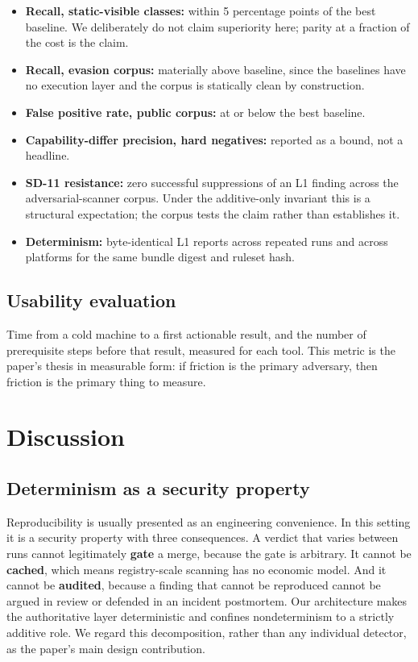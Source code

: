 \documentclass[11pt]{article}
\begin{document}
\begin{itemize}[leftmargin=*,itemsep=2pt]
\item \textbf{Recall, static-visible classes:} within 5 percentage points of the best baseline. We deliberately do not claim superiority here; parity at a fraction of the cost is the claim.
\item \textbf{Recall, evasion corpus:} materially above baseline, since the baselines have no execution layer and the corpus is statically clean by construction.
\item \textbf{False positive rate, public corpus:} at or below the best baseline.
\item \textbf{Capability-differ precision, hard negatives:} reported as a bound, not a headline.
\item \textbf{SD-11 resistance:} zero successful suppressions of an L1 finding across the adversarial-scanner corpus. Under the additive-only invariant this is a structural expectation; the corpus tests the claim rather than establishes it.
\item \textbf{Determinism:} byte-identical L1 reports across repeated runs and across platforms for the same bundle digest and ruleset hash.
\end{itemize}

\subsection{Usability evaluation}

Time from a cold machine to a first actionable result, and the number of prerequisite steps before that result, measured for each tool. This metric is the paper's thesis in measurable form: if friction is the primary adversary, then friction is the primary thing to measure.

\section{Discussion}
\label{sec:discussion}

\subsection{Determinism as a security property}

Reproducibility is usually presented as an engineering convenience. In this setting it is a security property with three consequences. A verdict that varies between runs cannot legitimately \textbf{gate} a merge, because the gate is arbitrary. It cannot be \textbf{cached}, which means registry-scale scanning has no economic model. And it cannot be \textbf{audited}, because a finding that cannot be reproduced cannot be argued in review or defended in an incident postmortem. Our architecture makes the authoritative layer deterministic and confines nondeterminism to a strictly additive role. We regard this decomposition, rather than any individual detector, as the paper's main design contribution.
\end{document}
